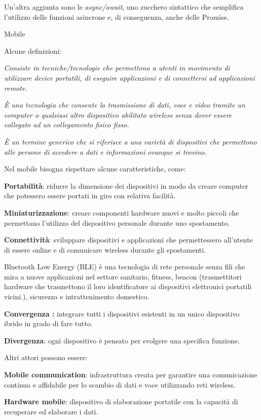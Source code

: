 Un'altra aggiunta sono le \emph{async/await}, uno zucchero sintattico
che semplifica l'utilizzo delle funzioni asincrone e, di conseguenza,
anche delle Promise.

Mobile

Alcune definizioni:

\emph{Consiste in tecniche/tecnologie che permettono a utenti in
movimento di utilizzare device portatili, di eseguire applicazioni e di
connettersi ad applicazioni remote.}

\emph{È una tecnologia che consente la trasmissione di dati, voce e
video tramite un computer o qualsiasi altro dispositivo abilitato
wireless senza dover essere collegato ad un collegamento fisico fisso.}

\emph{È un termine generico che si riferisce a una varietà di
dispositivi che permettono alle persone di accedere a dati e
informazioni ovunque si trovino.}

Nel mobile bisogna rispettare alcune caratteristiche, come:

\textbf{Portabilità}: ridurre la dimensione dei dispositivi in modo da
creare computer che potessero essere portati in giro con relativa
facilità.

\textbf{Miniaturizzazione}: creare componenti hardware nuovi e molto
piccoli che permettano l'utilizzo del dispositivo personale durante uno
spostamento.

\textbf{Connettività}: sviluppare dispositivi e applicazioni che
permettessero all'utente di essere online e di comunicare wireless
durante gli spostamenti.

Bluetooth Low Energy (BLE) è una tecnologia di rete personale senza fili
che mira a nuove applicazioni nel settore sanitario, fitness, beacon
(trasmettitori hardware che trasmettono il loro identificatore ai
dispositivi elettronici portatili vicini.), sicurezza e intrattenimento
domestico.

\textbf{Convergenza :} integrare tutti i dispositivi esistenti in un
unico dispositivo ibrido in grado di fare tutto.

\textbf{Divergenza}: ogni dispositivo è pensato per svolgere una
specifica funzione.

Altri attori possono essere:

\textbf{Mobile communication}: infrastruttura creata per garantire una
comunicazione continua e affidabile per lo scambio di dati e voce
utilizzando reti wireless.

\textbf{Hardware mobile}: dispositivo di elaborazione portatile con la
capacità di recuperare ed elaborare i dati.

